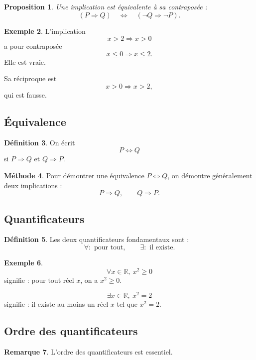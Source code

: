 \documentclass[11pt,a4paper]{article}
\theoremstyle{definition}
\newtheorem{definition}{Définition}[section]
\newtheorem{exemple}[definition]{Exemple}
\newtheorem{remarque}[definition]{Remarque}
\newtheorem{methode}[definition]{Méthode}
\theoremstyle{plain}
\newtheorem{proposition}[definition]{Proposition}
\newcommand{\R}{\mathbb{R}}
\begin{document}
\begin{proposition}
Une implication est équivalente à sa contraposée :
\[
(P\Rightarrow Q)\quad \Longleftrightarrow \quad (\neg Q\Rightarrow \neg P).
\]
\end{proposition}

\begin{exemple}
L'implication
\[
x>2 \Rightarrow x>0
\]
a pour contraposée
\[
x\leq 0 \Rightarrow x\leq 2.
\]
Elle est vraie.

Sa réciproque est
\[
x>0 \Rightarrow x>2,
\]
qui est fausse.
\end{exemple}

\subsection{Équivalence}

\begin{definition}
On écrit
\[
P\Longleftrightarrow Q
\]
si $P\Rightarrow Q$ et $Q\Rightarrow P$.
\end{definition}

\begin{methode}
Pour démontrer une équivalence $P\Longleftrightarrow Q$, on démontre généralement deux implications :
\[
P\Rightarrow Q,
\qquad
Q\Rightarrow P.
\]
\end{methode}

\subsection{Quantificateurs}

\begin{definition}
Les deux quantificateurs fondamentaux sont :
\[
\forall : \text{ pour tout},
\qquad
\exists : \text{ il existe}.
\]
\end{definition}

\begin{exemple}
\[
\forall x\in\R,\ x^2\geq 0
\]
signifie : pour tout réel $x$, on a $x^2\geq 0$.

\[
\exists x\in\R,\ x^2=2
\]
signifie : il existe au moins un réel $x$ tel que $x^2=2$.
\end{exemple}

\subsection{Ordre des quantificateurs}

\begin{remarque}
L'ordre des quantificateurs est essentiel.
\end{remarque}
\end{document}
